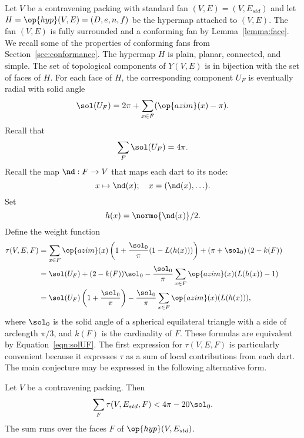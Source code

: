 Let $V$ be a contravening packing with standard fan
$(V,E)=(V,E_{std})$ and let $H=\op{hyp}(V,E)=(D,e,n,f)$ be the
hypermap attached to $(V,E)$.  The fan $(V,E)$ is fully surrounded and
a conforming fan by Lemma~\ref{lemma:face}.  We recall some of the
properties of conforming fans from Section~\ref{sec:conformance}.  The
hypermap $H$ is plain, planar, connected, and simple.  The set of
topological components of $Y(V,E)$ is in bijection with the set of
faces of $H$.  %
For each face of $H$, the corresponding component $U_F$ is eventually
radial with solid angle 
%
%
%
%
\begin{equation}\label{eqn:solUF}
\sol(U_F) = 2\pi + \sum_{x\in F} (\op{azim}(x) -\pi).
\end{equation}
Recall that
\begin{equation} 
\sum_{F} \sol(U_F) = 4\pi.
\end{equation}
Recall the map $\nd:F\to V$ that maps each dart to its node:
\[ 
x \mapsto \nd(x); \quad   x = (\nd(x),\ldots).
\] 
Set 
\[ h(x) = \normo{\nd(x)}/2.\] 
Define the weight function
\begin{align}
  \tau(V,E,F) &=\sum_{x\in F} \op{azim}(x)
  \left(1 + \dfrac{\sol_0}{\pi}(1- L(h(x)))\right) 
  + \left(\pi+{\sol_0}\right) (2- k(F))\qquad\phantom{t}\vspace{6pt}\nonumber\\
  &= \sol(U_F) + (2- k(F))\sol_0 - \dfrac{\sol_0}{\pi}
\sum_{x\in F}\op{azim}(x) (L(h(x)) - 1)\vspace{6pt}\nonumber\\
  &= \sol(U_F) \left( 1 + \dfrac{\sol_0}{\pi}\right) 
- \dfrac{\sol_0}{\pi} \sum_{x\in F} \op{azim}(x)(L(h(x))),\label{eqn:tau-sol}
\end{align}
where $\sol_0$ is the solid angle of a spherical equilateral triangle with a side of arclength $\pi/3$, and $k(F)$ is the cardinality of $F$.
% 
These formulas are equivalent by Equation~\ref{eqn:solUF}.  
The first expression for $\tau(V,E,F)$
is particularly convenient because it expresses $\tau$ as a sum of
local contributions from each dart.  
%
%
%
%
The main conjecture may be expressed in the following alternative
form.

\begin{lemma}[target]\label{lemma:4pi-sol}
Let $V$ be a contravening packing. %
Then
\[ 
\sum_F \tau (V,E_{std},F) < 4\pi - 20\sol_0.
\] 
The sum runs over the faces $F$ of $\op{hyp}(V,E_{std})$.
\end{lemma}

